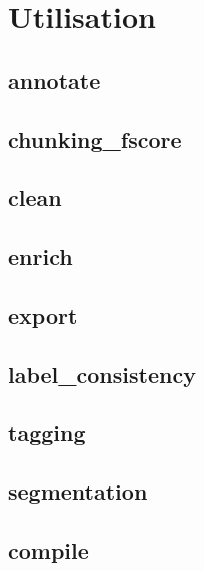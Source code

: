 \documentclass[12pt]{article}
\begin{document}
    \section{Utilisation}
    

        \subsection{annotate}
        

        \subsection{chunking\_fscore}
        

        \subsection{clean}
        

        \subsection{enrich}
        

        \subsection{export}
        

        \subsection{label\_consistency}
        

        \subsection{tagging}
        

        \subsection{segmentation}
        

        \subsection{compile}
        
\end{document}
